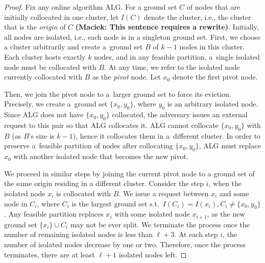 \documentclass[a4paper,anonymous,USenglish]{lipics-v2019}
\newcommand{\ALG}{\textsc{ALG}\xspace}
\newcommand\maciek[1]{\color{brown}\textbf{(Maciek: #1)}\color{black}}
\begin{document}
\begin{proof}
	Fix any online algorithm \ALG.
	For a ground set $C$ of nodes that are initially collocated in one cluster,
	let $I(C)$ denote the cluster,
	i.e., the cluster that is the \emph{origin} of $C$ \maciek{This sentence requires a rewrite}.
	Initially, all nodes are isolated, i.e., each node is in a singleton ground set.
	First, we choose a cluster arbitrarily and
	 create a~ground set $B$ of $k-1$ nodes in this cluster.
	Each cluster hosts exactly $k$ nodes, and in any feasible partition,
	 a~single isolated node must be collocated with $B$.
	At any time,
	we refer to the isolated node currently collocated with $B$ as the \emph{pivot} node.
	Let $x_0$ denote the first pivot node.

	Then, we join the pivot node to a~larger ground set to force its eviction.
	Precisely,
	we create a~ground set $\{x_0, y_0\}$, 	where
	 $y_0$ is an arbitrary isolated node.
	Since \ALG does not have $\{x_0,y_0\}$ collocated, 
	the adversary issues an external request to this pair so that \ALG collocates it.
	\ALG cannot collocate $\{x_0, y_0\}$ with $B$ (as $B$'s size is $k-1$), hence it collocates them in a~different cluster.
	In order to preserve a~feasible partition of nodes after collocating $\{x_0, y_0\}$,
	\ALG must replace $x_0$ with another isolated node that becomes the new pivot.

	We proceed in similar steps by joining the current pivot node to a ground set of the same origin residing in a different cluster.
	Consider the step $i$,
	when the isolated node $x_i$ is collocated with $B$.
	 We issue a request between $x_i$ and some node in $C_i$,
	 where $C_i$ is the largest ground set
	 s.t.~$I(C_i) = I(x_i), C_i \neq \{x_0,y_0\}$.
	Any feasible partition replaces $x_i$ with some isolated node $x_{i+1}$,
	as the new ground set $\{x_i\} \cup C_i $  may not be ever split.
	We terminate the process once the number of remaining isolated nodes 
	is less than $\ell+3$.
	At each step $i$,
	the number of isolated nodes decrease by one or two.
	Therefore, once the process terminates,
	there are at least $\ell+1$ isolated nodes left.
	

\end{proof}
\end{document}
